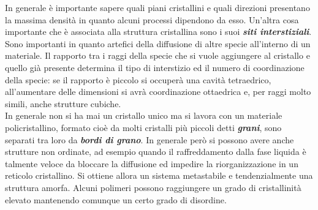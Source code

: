 In generale è importante sapere quali piani cristallini e quali direzioni presentano la massima densità in quanto alcuni processi dipendono da esso. Un'altra cosa importante che è associata alla struttura cristallina sono i suoi \textbf{\textit{siti interstiziali}}. Sono importanti in quanto artefici della diffusione di altre specie all'interno di un materiale. Il rapporto tra i raggi della specie che si vuole aggiungere al cristallo e quello già presente determina il tipo di interstizio ed il numero di coordinazione della specie: se il rapporto è piccolo si occuperà una cavità tetraedrico, all'aumentare delle dimensioni si avrà coordinazione ottaedrica e, per raggi molto simili, anche strutture cubiche.\\
In generale non si ha mai un cristallo unico ma si lavora con un materiale policristallino, formato cioè da molti cristalli più piccoli detti \textbf{\textit{grani}}, sono separati tra loro da \textbf{\textit{bordi di grano}}. In generale però si possono avere anche strutture non ordinate, ad esempio quando il raffreddamento dalla fase liquida è talmente veloce da bloccare la diffusione ed impedire la riorganizzazione in un reticolo cristallino. Si ottiene allora un sistema metastabile e tendenzialmente una struttura amorfa. Alcuni polimeri possono raggiungere un grado di cristallinità elevato mantenendo comunque un certo grado di disordine.

